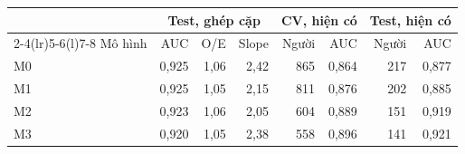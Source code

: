 \begin{tabular}{@{}lrrrrrrr@{}}
\toprule
& \multicolumn{3}{c}{Test, ghép cặp} & \multicolumn{2}{c}{CV, hiện có} & \multicolumn{2}{c}{Test, hiện có}\\
\cmidrule(lr){2-4}\cmidrule(lr){5-6}\cmidrule(l){7-8}
Mô hình & AUC & O/E & Slope & Người & AUC & Người & AUC\\
\midrule
M0 & 0,925 & 1,06 & 2,42 & 865 & 0,864 & 217 & 0,877\\
M1 & 0,925 & 1,05 & 2,15 & 811 & 0,876 & 202 & 0,885\\
M2 & 0,923 & 1,06 & 2,05 & 604 & 0,889 & 151 & 0,919\\
M3 & 0,920 & 1,05 & 2,38 & 558 & 0,896 & 141 & 0,921\\
\bottomrule
\end{tabular}
